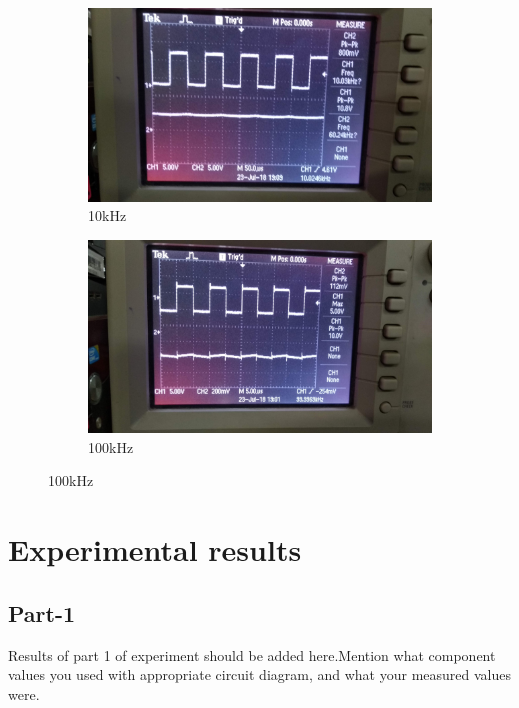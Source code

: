 \documentclass[12pt]{article}
\begin{document}
 \begin{figure}[h]
 \centering
 \begin{subfigure}{.5\textwidth}
   \centering
   \includegraphics[scale=0.045]{10khz.jpg}
   \caption{10kHz}
   \label{fig:test1}
 \end{subfigure}%
 \begin{subfigure}{.5\textwidth}
   \centering
   \includegraphics[scale=0.045]{100khz.jpg}
   \caption{100kHz}
   \label{fig:test2}
 \end{subfigure}
 \end{figure}




\section{Experimental results}

\subsection{Part-1}

Results of part 1 of experiment should be added here.Mention what component values you used with appropriate circuit diagram, and what your measured values were.
\end{document}
